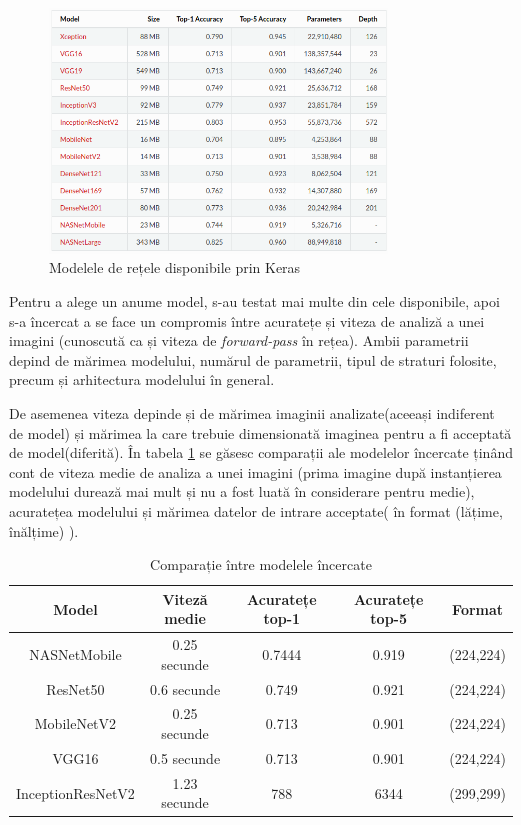 \begin{figure}[!htbp]
    \begin{center}
        \includegraphics[width=0.8\textwidth]{images/neuralnetworks.png}
        \caption{Modelele de rețele disponibile prin Keras\label{fig:networks}}
    \end{center}
\end{figure}

Pentru a alege un anume model, s-au testat mai multe din cele disponibile, apoi s-a încercat a se face un compromis între acuratețe și viteza de analiză a unei imagini (cunoscută ca și viteza de \textit{forward-pass} în rețea). Ambii parametrii depind de mărimea modelului, numărul de parametrii, tipul de straturi folosite, precum și arhitectura modelului în general.

De asemenea viteza depinde și de mărimea imaginii analizate(aceeași indiferent de model) și mărimea la care trebuie dimensionată imaginea pentru a fi acceptată de model(diferită). În tabela \ref{table:1} se găsesc comparații ale modelelor încercate ținând cont de viteza medie de analiza a unei imagini (prima imagine după instanțierea modelului durează mai mult și nu a fost luată în considerare pentru medie), acuratețea modelului și mărimea datelor de intrare acceptate( în format (lățime, înălțime) ).


\begin{table}[h!]
\centering
 \begin{tabular}{||c c c c c||} 
 \hline
 Model & Viteză medie & Acuratețe top-1 & Acuratețe top-5 & Format \\ [0.5ex] 
 \hline\hline
 NASNetMobile & 0.25 secunde & 0.7444 & 0.919 &(224,224) \\ 
 \hline
 ResNet50 & 0.6 secunde & 0.749 & 0.921 & (224,224) \\
 \hline
 MobileNetV2 & 0.25 secunde & 0.713 & 0.901 & (224,224) \\
 \hline
 VGG16 & 0.5 secunde & 0.713 & 0.901 & (224,224)  \\
 \hline
 InceptionResNetV2 & 1.23 secunde & 788 & 6344 &  (299,299) \\ [1ex] 
 \hline
\end{tabular}
\caption{Comparație între modelele încercate}
\label{table:1}
\end{table}

